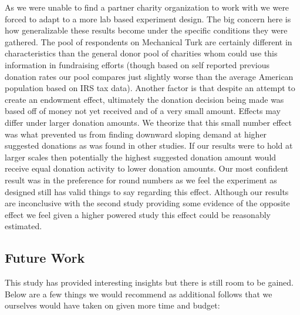 \documentclass[]{article}
\begin{document}
As we were unable to find a partner charity organization to work with we
were forced to adapt to a more lab based experiment design. The big
concern here is how generalizable these results become under the
specific conditions they were gathered. The pool of respondents on
Mechanical Turk are certainly different in characteristics than the
general donor pool of charities whom could use this information in
fundraising efforts (though based on self reported previous donation
rates our pool compares just slightly worse than the average American
population based on IRS tax data). Another factor is that despite an
attempt to create an endowment effect, ultimately the donation decision
being made was based off of money not yet received and of a very small
amount. Effects may differ under larger donation amounts. We theorize
that this small number effect was what prevented us from finding
downward sloping demand at higher suggested donations as was found in
other studies. If our results were to hold at larger scales then
potentially the highest suggested donation amount would receive equal
donation activity to lower donation amounts. Our most confident result
was in the preference for round numbers as we feel the experiment as
designed still has valid things to say regarding this effect. Although
our results are inconclusive with the second study providing some
evidence of the opposite effect we feel given a higher powered study
this effect could be reasonably estimated.

\subsection{Future Work}\label{future-work}

This study has provided interesting insights but there is still room to
be gained. Below are a few things we would recommend as additional
follows that we ourselves would have taken on given more time and
budget:
\end{document}
